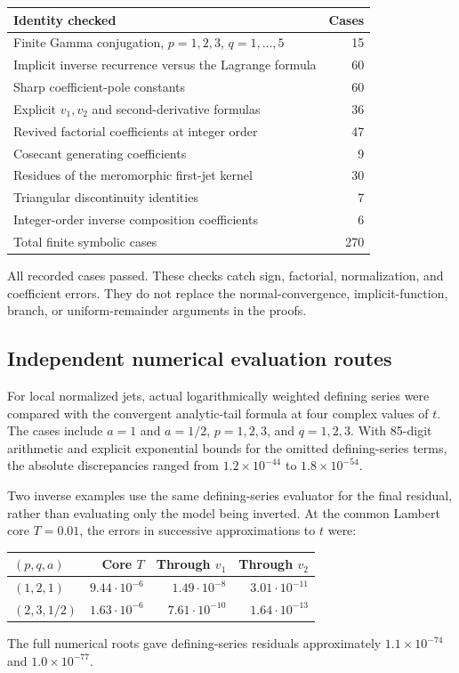 \documentclass[11pt,a4paper]{article}
\numberwithin{equation}{section}
\theoremstyle{definition}
\theoremstyle{remark}
\begin{document}
\begin{center}
\begin{tabular}{@{}p{}r@{}}
\toprule
Identity checked & Cases\\
\midrule
Finite Gamma conjugation, $p=1,2,3$, $q=1,\ldots,5$ & 15\\
Implicit inverse recurrence versus the Lagrange formula & 60\\
Sharp coefficient-pole constants & 60\\
Explicit $v_1,v_2$ and second-derivative formulas & 36\\
Revived factorial coefficients at integer order & 47\\
Cosecant generating coefficients & 9\\
Residues of the meromorphic first-jet kernel & 30\\
Triangular discontinuity identities & 7\\
Integer-order inverse composition coefficients & 6\\
\midrule
Total finite symbolic cases & 270\\
\bottomrule
\end{tabular}
\end{center}

All recorded cases passed. These checks catch sign, factorial,
normalization, and coefficient errors. They do not replace the
normal-convergence, implicit-function, branch, or uniform-remainder
arguments in the proofs.

\subsection{Independent numerical evaluation routes}

For local normalized jets, actual logarithmically weighted defining
series were compared with the convergent analytic-tail formula at
four complex values of $t$. The cases include $a=1$ and $a=1/2$,
$p=1,2,3$, and $q=1,2,3$. With 85-digit arithmetic and explicit
exponential bounds for the omitted defining-series terms, the
absolute discrepancies ranged from $1.2\times10^{-44}$ to
$1.8\times10^{-54}$.

Two inverse examples use the same defining-series evaluator for the
final residual, rather than evaluating only the model being inverted.
At the common Lambert core $T=0.01$, the errors in successive
approximations to $t$ were:
\begin{center}
\begin{tabular}{@{}lrrr@{}}
\toprule
$(p,q,a)$ & Core $T$ & Through $v_1$ & Through $v_2$\\
\midrule
$(1,2,1)$ &
$9.44\cdot10^{-6}$ & $1.49\cdot10^{-8}$ & $3.01\cdot10^{-11}$\\
$(2,3,1/2)$ &
$1.63\cdot10^{-6}$ & $7.61\cdot10^{-10}$ & $1.64\cdot10^{-13}$\\
\bottomrule
\end{tabular}
\end{center}
The full numerical roots gave defining-series residuals approximately
$1.1\times10^{-74}$ and $1.0\times10^{-77}$.
\end{document}
